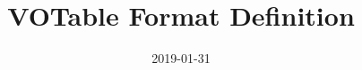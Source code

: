 \newenvironment{TABULAR}[2]{\begin{tabular}{#2}}{\end{tabular}}
\newenvironment{plain}{\begin{quote}}{\end{quote}}
\fi


\title{VOTable Format Definition}
\date{2019-01-31}



